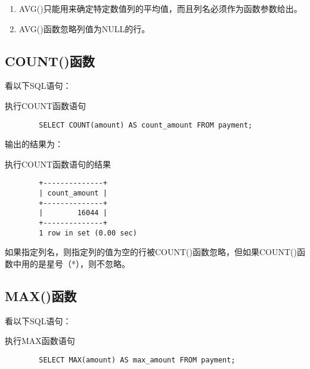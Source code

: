 \documentclass[UTF8]{article}
\begin{document}
\begin{orangebox}[frametitle={Tips 12.2.1 AVG()函数注意事项}]
        \begin{enumerate}
                \item AVG()只能用来确定特定数值列的平均值，而且列名必须作为函数参数给出。
                \item AVG()函数忽略列值为NULL的行。
        \end{enumerate}       
\end{orangebox}


\subsection{COUNT()函数}

看以下SQL语句：
\begin{listing}[H]
	\caption{执行COUNT函数语句}
	\label{code:countfunctionclause}
\begin{verbatim}
        SELECT COUNT(amount) AS count_amount FROM payment;      
\end{verbatim}
\end{listing}

输出的结果为：

\begin{listing}[H]
	\caption{执行COUNT函数语句的结果}
	\label{code:countfunctionclauseresult}
\begin{verbatim}
        +--------------+
        | count_amount |
        +--------------+
        |        16044 |
        +--------------+
        1 row in set (0.00 sec)
\end{verbatim}
\end{listing}

\begin{orangebox}[frametitle={Tips 12.3.1 COUNT()函数注意事项}]
        如果指定列名，则指定列的值为空的行被COUNT()函数忽略，但如果COUNT()函数中用的是星号（*），则不忽略。
\end{orangebox}

\subsection{MAX()函数}

看以下SQL语句：
\begin{listing}[H]
	\caption{执行MAX函数语句}
	\label{code:maxfunctionclause}
\begin{verbatim}
        SELECT MAX(amount) AS max_amount FROM payment;      
\end{verbatim}
\end{listing}
\end{document}
